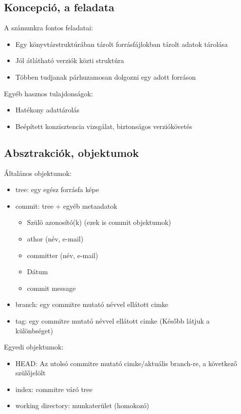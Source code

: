 	\subsection{Koncepció, a \git feladata}
	\begin{frame}
	  A \git számunkra fontos feladatai:
	  \begin{itemize}
	    \item{Egy könyvtárstruktúrában tárolt forrásfájlokban tárolt adatok tárolása}
	    \item{Jól átlátható verziók közti struktúra}
	    \item{Többen tudjanak párhuzamosan dolgozni egy adott forráson}
	  \end{itemize}
	  Egyéb hasznos tulajdonságok:
	  \begin{itemize}
	    \item{Hatékony adattárolás}
	    \item{Beépített konzisztencia vizsgálat, biztonságos verziókövetés}
	  \end{itemize}
	\end{frame}
	\subsection{Absztrakciók, objektumok}
	\begin{frame}
	  Általános objektumok:
	  \begin{itemize}
	    \item{tree: egy egész forrásfa képe}
	    \item{commit: tree + egyéb metaadatok}
	      \begin{itemize}
		\item{Szülö azonosító(k) (ezek is commit objektumok)}
		\item{athor (név, e-mail)}
		\item{committer (név, e-mail)}
		\item{Dátum}
		\item{commit message}
	      \end{itemize}
	    \item{branch: egy commitre mutató névvel ellátott cimke}
	    \item{tag: egy commitre mutató névvel ellátott cimke (Később látjuk a különbséget)}
	  \end{itemize}
	  Egyedi objektumok:
	  \begin{itemize}
	    \item{HEAD: Az utolsó commitre mutató cimke/aktuális branch-re, a következő szülőjelölt}
	    \item{index: commitre váró tree}
	    \item{working directory: munkaterület (homokozó)}
	  \end{itemize}
	\end{frame}
